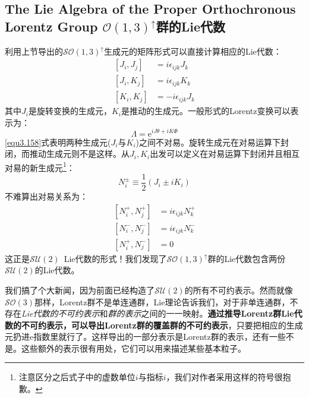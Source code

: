 \subsection[$\mathcal{SO}(1, 3)^\uparrow$群的Lie代数]{The Lie Algebra of the Proper Orthochronous Lorentz Group \quad $\mathcal{O}(1, 3)^\uparrow$群的Lie代数}
\label{equ3.7.3}
利用上节导出的$\mathcal{SO}(1, 3)^\uparrow$生成元的矩阵形式可以直接计算相应的Lie代数：
\begin{align}
\label{equ3.157}
	[J_i, J_j] &= i \epsilon_{ijk} J_k \\
\label{equ3.158}
	[J_i, K_j] &= i \epsilon_{ijk} K_k \\
\label{equ3.159}
	[K_i, K_j] &= -i \epsilon_{ijk} J_k
\end{align}
其中$J_i$是旋转变换的生成元，$K_i$是推动的生成元。一般形式的Lorentz变换可以表示为：
\begin{equation}
\label{equ3.160}
	\Lambda = \mathrm{e}^{i J \theta + i K \Phi}
\end{equation}
\eqref{equ3.158}式表明两种生成元($J_i$与$K_i$)之间不对易。旋转生成元在对易运算下封闭，而推动生成元则不是这样。从$J_i, K_i$出发可以定义在对易运算下封闭并且相互对易的新生成元\footnote{注意区分之后式子中的虚数单位$i$与指标$i$，我们对作者采用这样的符号很抱歉。}：
\begin{equation}
\label{equ3.161}
	N_i^\pm \equiv \frac{1}{2} (J_i \pm i K_i)
\end{equation}
不难算出对易关系为：
\begin{align}
\label{equ3.162}
	[N_i^+, N_j^+] &= i \epsilon_{ijk} N_k^+ \\
\label{equ3.163}
	[N_i^-, N_j^-] &= i \epsilon_{ijk} N_k^- \\
\label{equ3.164}
	[N_i^+, N_j^-] &= 0
\end{align}
这正是$\mathcal{SU}(2)$\, Lie代数的形式！我们发现了$\mathcal{SO}(1, 3)^\uparrow$群的Lie代数包含两份$\mathcal{SU}(2)$的Lie代数。

我们搞了个大新闻，因为前面已经构造了$\mathcal{SU}(2)$的所有不可约表示。然而就像$\mathcal{SO}(3)$那样，Lorentz群不是单连通群，Lie理论告诉我们，对于非单连通群，不存在{\it Lie代数的不可约表示}和{\it 群的表示}之间的一一映射。{\bf 通过推导Lorentz群Lie代数的不可约表示，可以导出Lorentz群的覆盖群的不可约表示}，只要把相应的生成元扔进$\mathrm{e}$指数里就行了。这样导出的一部分表示是Lorentz群的表示，还有一些不是。这些额外的表示很有用处，它们可以用来描述某些基本粒子。


